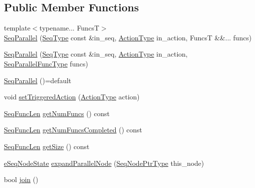 \subsection*{Public Member Functions}
\begin{DoxyCompactItemize}
\item 
{\footnotesize template$<$typename... FuncsT$>$ }\\\hyperlink{structvt_1_1seq_1_1_seq_parallel_a2b79a4c7f0ddc27499ad263bfd57c7da}{Seq\+Parallel} (\hyperlink{namespacevt_1_1seq_a3b612da217ac669d39c159f134ab8434}{Seq\+Type} const \&in\+\_\+seq, \hyperlink{namespacevt_ae0a5a7b18cc99d7b732cb4d44f46b0f3}{Action\+Type} in\+\_\+action, FuncsT \&\&... funcs)
\item 
\hyperlink{structvt_1_1seq_1_1_seq_parallel_a1ba47a7c08c48604178a7aac55ddc9c1}{Seq\+Parallel} (\hyperlink{namespacevt_1_1seq_a3b612da217ac669d39c159f134ab8434}{Seq\+Type} const \&in\+\_\+seq, \hyperlink{namespacevt_ae0a5a7b18cc99d7b732cb4d44f46b0f3}{Action\+Type} in\+\_\+action, \hyperlink{structvt_1_1seq_1_1_seq_parallel_a5804979becb9986676dcba10487eb8de}{Seq\+Parallel\+Func\+Type} funcs)
\item 
\hyperlink{structvt_1_1seq_1_1_seq_parallel_adaec7d806b4bc01e612fc1666a4c9107}{Seq\+Parallel} ()=default
\item 
void \hyperlink{structvt_1_1seq_1_1_seq_parallel_a19b3844758dcb47670d7fa428f6c7b7c}{set\+Triggered\+Action} (\hyperlink{namespacevt_ae0a5a7b18cc99d7b732cb4d44f46b0f3}{Action\+Type} action)
\item 
\hyperlink{structvt_1_1seq_1_1_seq_parallel_ab6a1d3fc6dbc5210e559c96f57f64e79}{Seq\+Func\+Len} \hyperlink{structvt_1_1seq_1_1_seq_parallel_af826493cdf253e4782563bf9757f273d}{get\+Num\+Funcs} () const
\item 
\hyperlink{structvt_1_1seq_1_1_seq_parallel_ab6a1d3fc6dbc5210e559c96f57f64e79}{Seq\+Func\+Len} \hyperlink{structvt_1_1seq_1_1_seq_parallel_a051904f27dbddab87b202c9bb86aa163}{get\+Num\+Funcs\+Completed} () const
\item 
\hyperlink{structvt_1_1seq_1_1_seq_parallel_ab6a1d3fc6dbc5210e559c96f57f64e79}{Seq\+Func\+Len} \hyperlink{structvt_1_1seq_1_1_seq_parallel_aa8fb8295fd13135a7bd989f570fe8cb9}{get\+Size} () const
\item 
\hyperlink{namespacevt_1_1seq_ad7b0496818667d816e00f717491d3b92}{e\+Seq\+Node\+State} \hyperlink{structvt_1_1seq_1_1_seq_parallel_a76d99828f1f5ff95f3ab25765a2453c3}{expand\+Parallel\+Node} (\hyperlink{namespacevt_1_1seq_ae6a4874b585be0612aaca32ca6d2d191}{Seq\+Node\+Ptr\+Type} this\+\_\+node)
\item 
bool \hyperlink{structvt_1_1seq_1_1_seq_parallel_a57f8521e9444d248d46957cc3677db08}{join} ()
\end{DoxyCompactItemize}


